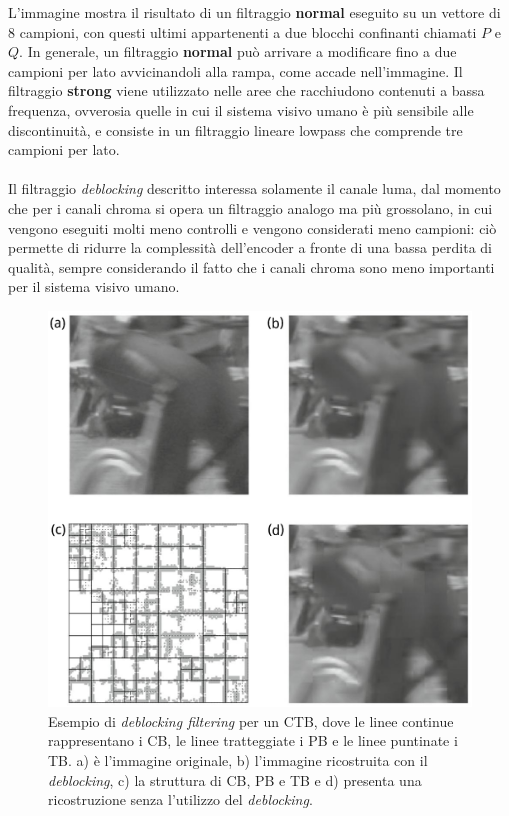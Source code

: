 L'immagine mostra il risultato di un filtraggio \textbf{normal} eseguito su un 
vettore di 8 campioni, con questi ultimi appartenenti a due blocchi confinanti 
chiamati $P$ e $Q$.
In generale, un filtraggio \textbf{normal} può arrivare a modificare fino a due
campioni per lato avvicinandoli alla rampa, come accade nell'immagine.
Il filtraggio \textbf{strong} viene utilizzato nelle aree che racchiudono 
contenuti a bassa frequenza, ovverosia quelle in cui il sistema visivo umano è 
più sensibile alle discontinuità, e consiste in un filtraggio lineare lowpass 
che comprende tre campioni per lato.
\\ \\
Il filtraggio \emph{deblocking} descritto interessa solamente il canale luma, 
dal momento che per i canali chroma si opera un filtraggio analogo ma più 
grossolano, in cui vengono eseguiti molti meno controlli e vengono considerati 
meno campioni: ciò permette di ridurre la complessità dell'encoder a fronte di 
una bassa perdita di qualità, sempre considerando il fatto che i canali chroma 
sono meno importanti per il sistema visivo umano.

\begin{figure}[H]
  \centering
  \captionsetup{justification=raggedright}
  \includegraphics[scale=.42]{Figures/deblocking_filter_example}
  \caption[Esempio di \emph{deblocking filtering}]
          {Esempio di \emph{deblocking filtering} per un CTB, dove le linee
           continue rappresentano i CB, le linee tratteggiate i PB e le linee
           puntinate i TB. a) è l'immagine originale, b) l'immagine ricostruita
           con il \emph{deblocking}, c) la struttura di CB, PB e TB e d) 
           presenta una ricostruzione senza l'utilizzo del \emph{deblocking}.}
\end{figure}

